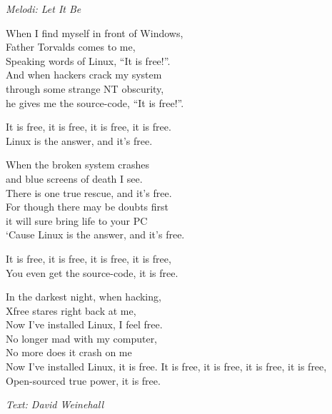 {\footnotesize\textit{Melodi: Let It Be}}\par
\vspace{10pt}
When I find myself in front of Windows,\\
Father Torvalds comes to me,\\
Speaking words of Linux, ``It is free!''.\\
And when hackers crack my system\\
through some strange NT obscurity,\\
he gives me the source-code, ``It is free!''.\par
\vspace{10pt}
It is free, it is free, it is free, it is free.\\
Linux is the answer, and it's free.\par
\vspace{10pt}
When the broken system crashes\\
and blue screens of death I see.\\
There is one true rescue, and it's free.\\
For though there may be doubts first\\
it will sure bring life to your PC\\
`Cause Linux is the answer, and it's free.\par
\vspace{10pt}
It is free, it is free, it is free, it is free,\\
You even get the source-code, it is free.\par
\vspace{10pt}
In the darkest night, when hacking,\\
Xfree stares right back at me,\\
Now I've installed Linux, I feel free.\\
No longer mad with my computer,\\
No more does it crash on me\\
Now I've installed Linux, it is free.
\newpage
It is free, it is free, it is free, it is free,\\
Open-sourced true power, it is free.\par
\vspace{10pt}
{\footnotesize\textit{Text: David Weinehall}}
